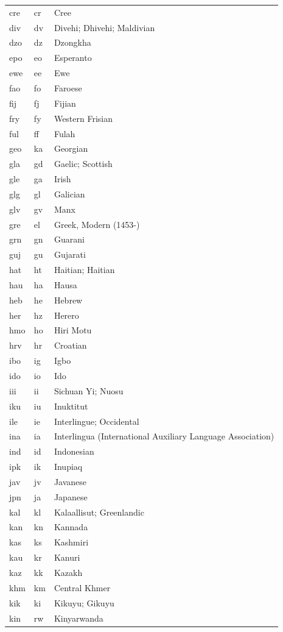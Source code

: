 \begin{longtable}{|L{3cm}|L{3cm}|L{5cm}|}
cre & cr & Cree\\
div & dv & Divehi; Dhivehi; Maldivian\\
dzo & dz & Dzongkha\\
epo & eo & Esperanto\\
ewe & ee & Ewe\\
fao & fo & Faroese\\
fij & fj & Fijian\\
fry & fy & Western Frisian\\
ful & ff & Fulah\\
geo & ka & Georgian\\
gla & gd & Gaelic; Scottish\\
gle & ga & Irish\\
glg & gl & Galician\\
glv & gv & Manx\\
gre & el & Greek, Modern (1453-)\\
grn & gn & Guarani\\
guj & gu & Gujarati\\
hat & ht & Haitian; Haitian\\
hau & ha & Hausa\\
heb & he & Hebrew\\
her & hz & Herero\\
hmo & ho & Hiri Motu\\
hrv & hr & Croatian\\
ibo & ig & Igbo\\
ido & io & Ido\\
iii & ii & Sichuan Yi; Nuosu\\
iku & iu & Inuktitut\\
ile & ie & Interlingue; Occidental\\
ina & ia & Interlingua (International Auxiliary Language Association)\\
ind & id & Indonesian\\
ipk & ik & Inupiaq\\
jav & jv & Javanese\\
jpn & ja & Japanese\\
kal & kl & Kalaallisut; Greenlandic\\
kan & kn & Kannada\\
kas & ks & Kashmiri\\
kau & kr & Kanuri\\
kaz & kk & Kazakh\\
khm & km & Central Khmer\\
kik & ki & Kikuyu; Gikuyu\\
kin & rw & Kinyarwanda\\

\end{longtable}
